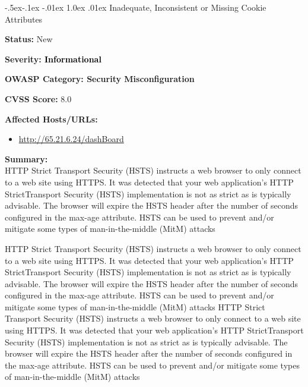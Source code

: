 \documentclass{article}
\makeatletter
\renewcommand{\subsection}{\@startsection{subsection}{2}{\z@}%
            {-.5ex\@plus -.1ex \@minus -.01ex}%
            {1.0ex \@plus .01ex}%
            {\normalfont\large\color{subsectioncolor}}}
\makeatother
\begin{document}
                \subsection{\large Inadequate, Inconsistent or Missing Cookie Attributes}
                \begin{description}[itemsep=2pt, leftmargin=0.2cm]
                    \item \large \textbf{Status:} New
                    \item \large \textbf{Severity: \textcolor{infotext} {Informational}}
                    \item \large \textbf{OWASP Category: Security Misconfiguration}
                    \item \large \textbf{CVSS Score:} 8.0 
                    \item \large \textbf{Affected Hosts/URLs:}
                           \begin{itemize} 
                           \item \large \href{http://65.21.6.24/dashBoard} {http://65.21.6.24/dashBoard}
                           \end{itemize}
                    \item \large \textbf{Summary:} \\  HTTP Strict Transport Security (HSTS) instructs a web browser to only connect to a web site using HTTPS. It was detected that your web application's HTTP StrictTransport Security (HSTS) implementation is not as strict as is typically advisable.
 The browser will expire the HSTS header after the number of seconds configured in the max-age attribute. HSTS can be used to prevent and/or mitigate some types of man-in-the-middle (MitM) attacks 

HTTP Strict Transport Security (HSTS) instructs a web browser to only connect to a web site using HTTPS. It was detected that your web application's HTTP StrictTransport Security (HSTS) implementation is not as strict as is typically advisable.
 The browser will expire the HSTS header after the number of seconds configured in the max-age attribute. HSTS can be used to prevent and/or mitigate some types of man-in-the-middle (MitM) attacks 
HTTP Strict Transport Security (HSTS) instructs a web browser to only connect to a web site using HTTPS. It was detected that your web application's HTTP StrictTransport Security (HSTS) implementation is not as strict as is typically advisable.
 The browser will expire the HSTS header after the number of seconds configured in the max-age attribute. HSTS can be used to prevent and/or mitigate some types of man-in-the-middle (MitM) attacks 


\end{description}
\end{document}
